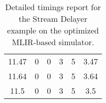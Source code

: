 \begin{table}[h]
{\begin{tabular}{cccccc}
            11.47              & 0                          & 0                          & 3                          & 5                          & 3.47                   \\
            11.64              & 0                          & 0                          & 3                          & 5                          & 3.64                   \\
            11.5               & 0                          & 0                          & 3                          & 5                          & 3.5                    \\
            \bottomrule
        \end{tabular}
    }
    \caption{Detailed timings report for the Stream Delayer example on the optimized MLIR-based simulator.}
\end{table}

